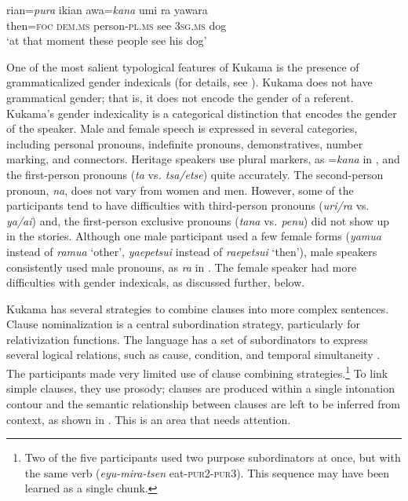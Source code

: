 \documentclass[output=paper]{langscibook}
\begin{document}
\ea\label{ex:7:1}
\gll  rian=\textit{pura} ikian     awa=\textit{kana} umi ra yawara\\
  then=\textsc{foc}  \textsc{dem.ms}  person-\textsc{pl.ms}  see  \textsc{3sg.ms}   dog\\
\glt ‘at that moment these people see his dog’
\z

One of the most salient typological features of Kukama is the presence of grammaticalized gender indexicals (for details, see \citealt{Vallejos2015}). Kukama does not have grammatical gender; that is, it does not encode the gender of a referent. Kukama’s gender indexicality is a categorical distinction that encodes the gender of the speaker. Male and female speech is expressed in several categories, including personal pronouns, indefinite pronouns, demonstratives, number marking, and connectors. Heritage speakers use plural markers, as =\textit{kana} in , and the first-person pronouns (\textit{ta} vs\textit{. tsa/etse}) quite accurately. The second-person pronoun, \textit{na}, does not vary from women and men. However, some of the participants tend to have difficulties with third-person pronouns (\textit{uri/ra} vs. \textit{ya/ai}) and, the first-person exclusive pronouns (\textit{tana} vs\textit{. penu}) did not show up in the stories. Although one male participant used a few female forms (\textit{yamua} instead of \textit{ramua} ‘other’, \textit{yaepetsui} instead of \textit{raepetsui} ‘then’), male speakers consistently used male pronouns, as \textit{ra} in . The female speaker had more difficulties with gender indexicals, as discussed further, below.

Kukama has several strategies to combine clauses into more complex sentences. Clause nominalization is a central subordination strategy, particularly for relativization functions. The language has a set of subordinators to express several logical relations, such as cause, condition, and temporal simultaneity \citep{Vallejos2016a}. The participants made very limited use of clause combining strategies.\footnote{ {Two of the five participants used two purpose subordinators at once, but with the same verb (}{\textit{eyu-mira-tsen}} {eat-\textsc{pur}2-\textsc{pur}3). This sequence may have been learned as a single chunk.}} To link simple clauses, they use prosody; clauses are produced within a single intonation contour and the semantic relationship between clauses are left to be inferred from context, as shown in . This is an area that needs attention.
\end{document}
